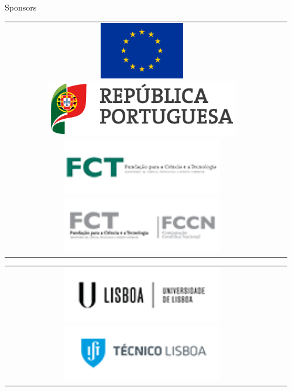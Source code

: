 \documentclass[final]{beamer}
\newlength{\sepmargin}
\newlength{\onecolwid}
\begin{document}
\begin{frame}[t]
\begin{columns}[t]
\begin{column}{\sepmargin} \end{column}
\begin{column}{\onecolwid} %
\begin{block}{\large Sponsors}
\begin{tabular}{SL}
\includegraphics[height=2.5cm]{Flag_of_Europe.png}
\hspace*{0.50cm}
\includegraphics[height=2.5cm]{republica_portuguesa.png}
\hspace*{0.50cm}
\includegraphics[height=2.5cm]{fct.png}
\hspace*{0.50cm}
\includegraphics[height=2.5cm]{fccn.png}
&
\end{tabular}
\begin{tabular}{SL}
\includegraphics[height=2.5cm]{ulisboa.png}
\hspace*{0.50cm}
\includegraphics[height=2.5cm]{IST_C_RGB_POS.png}

\end{tabular}
\end{block}
\end{column}
\end{columns}
\end{frame}
\end{document}
